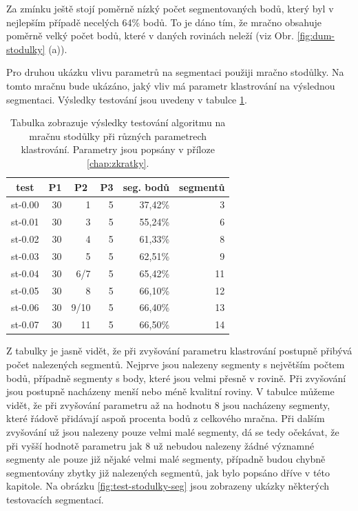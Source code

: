 \documentclass[11pt,twoside,a4paper]{book}
\begin{document}
Za zmínku ještě stojí poměrně nízký počet segmentovaných bodů, který byl v nejlepším případě necelých 64\% bodů. To je dáno tím, že mračno obsahuje poměrně velký počet bodů, které v daných rovinách neleží (viz Obr. \ref{fig:dum-stodulky} (a)).

Pro druhou ukázku vlivu parametrů na segmentaci použiji mračno stodůlky. Na tomto mračnu bude ukázáno, jaký vliv má parametr klastrování na výslednou segmentaci. Výsledky testování jsou uvedeny v tabulce \ref{table:test3-klastr}.

\begin{table}[ht]
\begin{center}
\begin{tabular}{|r|r|r|r|r|r|}
\hline
\multicolumn{1}{|c|}{\textbf{test}} & \multicolumn{1}{c|}{\textbf{P1}} & \multicolumn{1}{c|}{\textbf{P2}} & \multicolumn{1}{c|}{\textbf{P3}} & \multicolumn{1}{c|}{\textbf{seg. bodů}} & \multicolumn{1}{c|}{\textbf{segmentů}} \\ \hline
st-0.00 & 30 & 1 & 5 & 37,42\% & 3 \\ \hline
st-0.01 & 30 & 3 & 5 & 55,24\% & 6 \\ \hline
st-0.02 & 30 & 4 & 5 & 61,33\% & 8 \\ \hline
st-0.03 & 30 & 5 & 5 & 62,51\% & 9 \\ \hline
st-0.04 & 30 & 6/7 & 5 & 65,42\% & 11 \\ \hline
st-0.05 & 30 & 8 & 5 & 66,10\% & 12 \\ \hline
st-0.06 & 30 & 9/10 & 5 & 66,40\% & 13 \\ \hline
st-0.07 & 30 & 11 & 5 & 66,50\% & 14 \\ \hline
\end{tabular}
\caption{Tabulka zobrazuje výsledky testování algoritmu na mračnu stodůlky při různých parametrech klastrování. Parametry jsou popsány v příloze \ref{chap:zkratky}.} 
\label{table:test3-klastr}
\end{center}
\end{table}

Z tabulky je jasně vidět, že při zvyšování parametru klastrování postupně přibývá počet nalezených segmentů. Nejprve jsou nalezeny segmenty s největším počtem bodů, případně segmenty s body, které jsou velmi přesně v rovině. Při zvyšování jsou postupně nacházeny menší nebo méně kvalitní roviny. V tabulce můžeme vidět, že při zvyšování parametru až na hodnotu 8 jsou nacházeny segmenty, které řádově přidávají aspoň procenta bodů z celkového mračna. Při dalším zvyšování už jsou nalezeny pouze velmi malé segmenty, dá se tedy očekávat, že při vyšší hodnotě parametru jak 8 už nebudou nalezeny žádné významné segmenty ale pouze již nějaké velmi malé segmenty, případně budou chybně segmentovány zbytky již nalezených segmentů, jak bylo popsáno dříve v této kapitole. Na obrázku \ref{fig:test-stodulky-seg} jsou zobrazeny ukázky některých testovacích segmentací.
\end{document}
